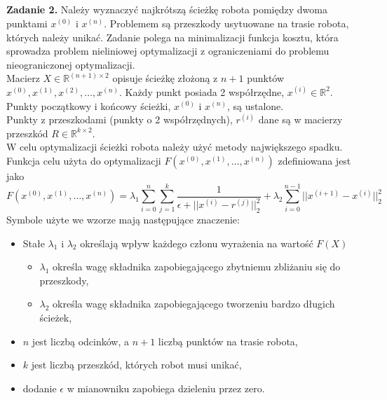 \documentclass[11pt, leqno]{scrartcl}
\begin{document}
    \subsection*{}
    \textbf{Zadanie 2.} Należy wyznaczyć najkrótszą ścieżkę robota
    pomiędzy dwoma punktami $x^{(0)}$ i $x^{(n)}$. Problemem są
    przeszkody usytuowane na trasie robota, których należy unikać.
    Zadanie polega na minimalizacji funkcja kosztu, która sprowadza
    problem nieliniowej optymalizacji z ograniczeniami do problemu
    nieograniczonej optymalizacji. \\
    Macierz $X \in \mathbb{R}^{(n+1)\times 2}$ opisuje ścieżkę
    złożoną z $n+1$ punktów $x^{(0)},x^{(1)},x^{(2)},\ldots ,
    x^{(n)}$. Każdy punkt posiada 2 współrzędne, $x^{(i)} \in
    \mathbb{R}^2$. Punkty początkowy i końcowy ścieżki, $x^{(0)}$
    i $x^{(n)}$, są ustalone. \\
    Punkty z przeszkodami (punkty o 2 współrzędnych), $r^{(i)}$ dane
    są w macierzy przeszkód $R \in \mathbb{R}^{k\times 2}$. \\
    W celu optymalizacji ścieżki robota należy użyć metody
    największego spadku. Funkcja celu użyta do optymalizacji
    $F(x^{(0)},x^{(1)},\dots ,x^{(n)})$ zdefiniowana jest jako
    \[
        F(x^{(0)},x^{(1)},\dots ,x^{(n)})=\lambda _1
            \sum_{i=0}^{n}\sum_{j=1}^{k}\frac{1}
            {\epsilon +||x^{(i)}-r^{(j)}||_2^2}+\lambda _2
            \sum_{i=0}^{n-1}||x^{(i+1)}-x^{(i)}||_2^2
    \]
    Symbole użyte we wzorze mają następujące znaczenie:
    \begin{itemize}
        \item Stałe $\lambda _1$ i $\lambda _2$ określają wpływ
            każdego członu wyrażenia na wartość $F(X)$
            \begin{itemize}[label=--]
                \item $\lambda _1$ określa wagę składnika
                    zapobiegającego zbytniemu zbliżaniu się do
                    przeszkody,
                \item $\lambda _2$ określa wagę składnika
                    zapobiegającego tworzeniu bardzo długich
                    ścieżek,
            \end{itemize}
        \item $n$ jest liczbą odcinków, a $n+1$ liczbą punktów na
            trasie robota,
        \item $k$ jest liczbą przeszkód, których robot musi unikać,
        \item dodanie $\epsilon$ w mianowniku zapobiega dzieleniu
            przez zero.
    \end{itemize}
\end{document}
